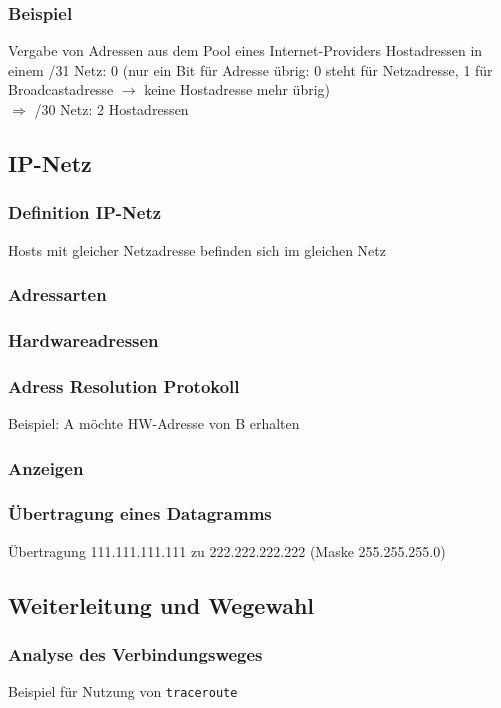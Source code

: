 \subsubsection*{Beispiel}
Vergabe von Adressen aus dem Pool eines Internet-Providers
Hostadressen in einem /31 Netz: 0 (nur ein Bit für Adresse übrig: 0 steht für Netzadresse, 1 für Broadcastadresse $\to$ keine Hostadresse mehr übrig)\\
$\Rightarrow$ /30 Netz: 2 Hostadressen
\subsection{IP-Netz}
\subsubsection{Definition IP-Netz}
Hosts mit gleicher Netzadresse befinden sich im gleichen Netz
\subsubsection{Adressarten}
\subsubsection{Hardwareadressen}
\subsubsection{Adress Resolution Protokoll}
Beispiel: A möchte HW-Adresse von B erhalten
\subsubsection*{Anzeigen}
\subsubsection{Übertragung eines Datagramms}
Übertragung 111.111.111.111 zu 222.222.222.222 (Maske 255.255.255.0)

\subsection{Weiterleitung und Wegewahl}
\subsubsection{Analyse des Verbindungsweges}
Beispiel für Nutzung von \lstinline|traceroute|

